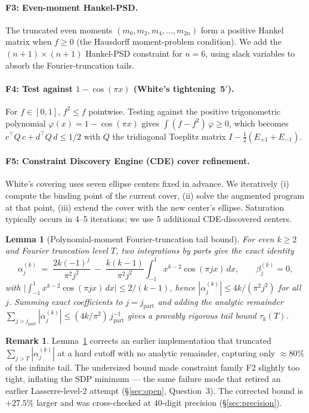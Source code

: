 \documentclass[11pt]{article}
\theoremstyle{plain}
\newtheorem{lemma}[theorem]{Lemma}
\theoremstyle{definition}
\newtheorem{remark}[theorem]{Remark}
\begin{document}
\paragraph{F3: Even-moment Hankel-PSD.} The truncated even moments
$(m_0, m_2, m_4, \dots, m_{2n})$ form a positive Hankel matrix when
$f \ge 0$ (the Hausdorff moment-problem condition). We add the
$(n+1)\times(n+1)$ Hankel-PSD constraint for $n = 6$, using slack
variables to absorb the Fourier-truncation tails.

\paragraph{F4: Test against $1 - \cos(\pi x)$ (White's tightening~5$'$).}
For $f \in [0,1]$, $f^2 \le f$ pointwise. Testing against the
positive trigonometric polynomial $\varphi(x) = 1 - \cos(\pi x)$ gives
$\int (f - f^2)\, \varphi \ge 0$, which becomes
$c^\top Q\, c + d^\top Q\, d \le 1/2$ with $Q$ the tridiagonal Toeplitz
matrix $I - \tfrac12(E_{+1} + E_{-1})$.

\paragraph{F5: Constraint Discovery Engine (CDE) cover refinement.}
White's covering uses seven ellipse centers fixed in advance. We
iteratively (i) compute the binding point of the current cover,
(ii) solve the augmented program at that point, (iii) extend the cover
with the new center's ellipse. Saturation typically occurs in 4--5
iterations; we use 5 additional CDE-discovered centers.

\begin{lemma}[Polynomial-moment Fourier-truncation tail bound]\label{lem:tail}
For even $k \ge 2$ and Fourier truncation level $T$, two integrations
by parts give the exact identity
\[
\alpha_j^{(k)} \;=\; \frac{2k(-1)^j}{\pi^2 j^2}
\;-\; \frac{k(k-1)}{\pi^2 j^2}\int_{-1}^1 x^{k-2}\cos(\pi j x)\,dx,
\qquad \beta_j^{(k)} = 0,
\]
with $\bigl|\int_{-1}^1 x^{k-2}\cos(\pi j x)\,dx\bigr| \le 2/(k-1)$,
hence $|\alpha_j^{(k)}| \le 4k/(\pi^2 j^2)$ for all $j$. Summing exact
coefficients to $j = j_{\mathrm{part}}$ and adding the analytic
remainder $\sum_{j > j_{\mathrm{part}}}|\alpha_j^{(k)}| \le
(4k/\pi^2)\,j_{\mathrm{part}}^{-1}$ gives a provably rigorous tail
bound $\tau_k(T)$.
\end{lemma}

\begin{remark}
Lemma~\ref{lem:tail} corrects an earlier implementation that truncated
$\sum_{j>T}|\alpha_j^{(k)}|$ at a hard cutoff with no analytic
remainder, capturing only $\approx 80\%$ of the infinite tail. The
undersized bound made constraint family F2 slightly too tight,
inflating the SDP minimum --- the same failure mode that retired an
earlier Lasserre-level-2 attempt (\S\ref{sec:open}, Question~3). The
corrected bound is $+27.5\%$ larger and was cross-checked at $40$-digit
precision (\S\ref{sec:precision}).
\end{remark}
\end{document}
